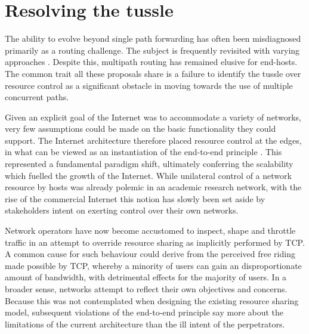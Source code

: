 \section{Resolving the tussle}

The ability to evolve beyond single path forwarding has often been misdiagnosed primarily as a routing challenge. 
The subject is frequently revisited with varying approaches \cite{Sunshine:1977p152,Yang:2003p136,Yang:2006p405,Godfrey:2009p36}. 
Despite this, multipath routing has remained elusive for end-hosts. 
The common trait all these proposals share is a failure to identify the tussle over resource control as a significant obstacle in moving towards the use of multiple concurrent paths.

Given an explicit goal of the Internet was to accommodate a variety of networks, very few assumptions could be made on the basic functionality they could support.
The Internet architecture therefore placed resource control at the edges, in what can be viewed as an instantiation of the end-to-end principle \cite{Saltzer:1984p305}. 
This represented a fundamental paradigm shift, ultimately conferring the scalability which fuelled the growth of the Internet.  
While unilateral control of a network resource by hosts was already polemic in an academic research network, with the rise of the commercial Internet this notion has slowly been set aside by stakeholders intent on exerting control over their own networks.

Network operators have now become accustomed to inspect, shape and throttle traffic in an attempt to override resource sharing as implicitly performed by \ac{TCP}. 
A common cause for such behaviour could derive from the perceived free riding made possible by \ac{TCP}, whereby a minority of users can gain an disproportionate amount of bandwidth, with detrimental effects for the majority of users. 
In a broader sense, networks attempt to reflect their own objectives and concerns. 
Because this was not contemplated when designing the existing resource sharing model, subsequent violations of the end-to-end principle say more about the limitations of the current architecture than the ill intent of the perpetrators. 

